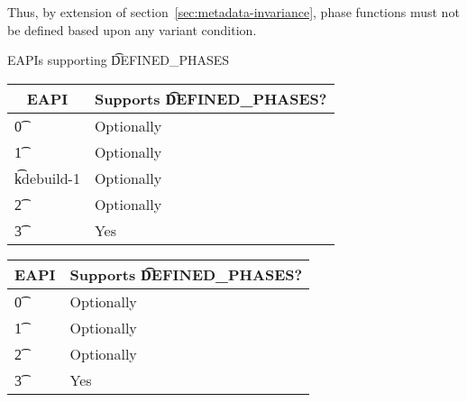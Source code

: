 \note Thus, by extension of section~\ref{sec:metadata-invariance}, phase functions must not be defined
based upon any variant condition.

\begin{centertable}{EAPIs supporting \t{DEFINED\_PHASES}} \label{tab:defined-phases-table}
\IFKDEBUILDELSE
{
    \begin{tabular}{ l l }
        \toprule
        \multicolumn{1}{c}{\textbf{EAPI}} &
        \multicolumn{1}{c}{\textbf{Supports \t{DEFINED\_PHASES}?}} \\
        \midrule
    \t{0} & Optionally \\
    \t{1} & Optionally \\
    \t{kdebuild-1} & Optionally \\
    \t{2} & Optionally \\
    \t{3} & Yes \\
    \bottomrule
    \end{tabular}
}
{
    \begin{tabular}{ l l }
        \toprule
        \multicolumn{1}{c}{\textbf{EAPI}} &
        \multicolumn{1}{c}{\textbf{Supports \t{DEFINED\_PHASES}?}} \\
        \midrule
    \t{0} & Optionally \\
    \t{1} & Optionally \\
    \t{2} & Optionally \\
    \t{3} & Yes \\
    \bottomrule
    \end{tabular}
}
\end{centertable}


